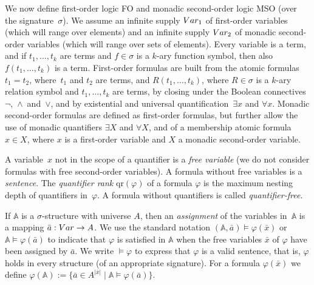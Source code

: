 \documentclass[1p,number,a4paper]{elsarticle}
\theoremstyle{remark}
\newcommand{\strA}{\mathbb{A}}
\renewcommand{\phi}{\varphi}
\begin{document}
We now define first-order logic FO and monadic second-order logic MSO (over the signature~$\sigma$). We assume an infinite supply $\textsc{Var}_1$ of first-order variables (which will range over elements) and an infinite supply $\textsc{Var}_2$ of monadic second-order variables (which will range over sets of elements). 
Every variable is a term, and if $t_1,\ldots, t_k$ are terms and $f\in \sigma$ is a $k$-ary function symbol, then also $f(t_1,\ldots, t_k)$ is a term. 
First-order formulas are built from the atomic formulas $t_1=t_2$, where~$t_1$ and $t_2$ are terms, and $R(t_1,\ldots, t_k)$, where \mbox{$R\in \sigma$}
is a $k$-ary relation symbol
and $t_1,\ldots, t_k$ are terms, by closing under the Boolean
connec\-tives~$\neg$,~$\wedge$~and~$\vee$, and by existential and
universal quantification~$\exists x$ and $\forall x$. 
Monadic second-order formulas are defined as first-order formulas, but further
allow the use of monadic quantifiers $\exists X$ and $\forall X$, and of a membership atomic formula $x\in X$, where $x$ is a first-order variable and $X$ a monadic second-order variable. 

A variable~$x$ not in the scope of a quantifier is a {\em free variable} (we do not consider formulas with free second-order variables). A formula without free variables is a {\em sentence}.
The {\em quantifier rank} $\mathrm{qr}(\varphi)$ of a formula $\varphi$ is the
maximum nesting depth of quantifiers in~$\phi$. 
A formula without quantifiers is called {\em quantifier-free}.

If $\strA$ is a $\sigma$-structure
with universe $A$, then an {\em assignment} of the variables in~$\strA$
is a mapping $\bar a:\textsc{Var} \rightarrow A$. We use the standard
notation $(\strA, \bar a)\models \phi(\bar x)$ or $\strA \models \phi(\bar a)$
to indicate that $\phi$ is satisfied in $\strA$ when the free variables $\bar x$
of $\phi$ have been assigned by $\bar a$. 
We write $\models\phi$ to express that $\phi$ is a valid sentence, that is, $\phi$ holds in every structure (of an appropriate signature). 
For a formula $\phi(\bar x)$ we define $\phi(\strA):=\{\bar a\in A^{|\bar x|} \mid \strA\models\phi(\bar a)\}$.
\end{document}
